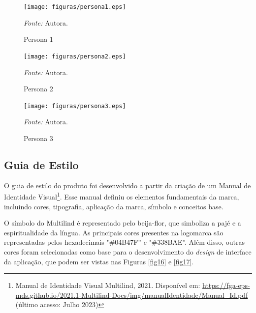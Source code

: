 \begin{figure}[h!]
	\centering
	\caption{Persona 1}
	\begin{adjustbox}{center}
		\texttt{[image: figuras/persona1.eps]}
	\end{adjustbox}
	\begin{tablenotes}[flushleft]
		\centering
		\item \textit{Fonte:} Autora.
	\end{tablenotes}
	\label{fig13}
\end{figure}

\begin{figure}[h!]
	\centering
	\caption{Persona 2}
	\begin{adjustbox}{center}
		\texttt{[image: figuras/persona2.eps]}
	\end{adjustbox}
	\begin{tablenotes}[flushleft]
		\centering
		\item \textit{Fonte:} Autora.
	\end{tablenotes}
	\label{fig14}
\end{figure}

\pagebreak

\begin{figure}[h!]
	\centering
	\caption{Persona 3}
	\begin{adjustbox}{center}
		\texttt{[image: figuras/persona3.eps]}
	\end{adjustbox}
	\begin{tablenotes}[flushleft]
		\centering
		\item \textit{Fonte:} Autora.
	\end{tablenotes}
	\label{fig15}
\end{figure}

\subsection{Guia de Estilo}
\label{Guia de Estilo}
O guia de estilo do produto foi desenvolvido a partir da criação de um Manual de Identidade Visual\footnote{Manual de Identidade Visual Multilind, 2021. Disponível
em: \url{https://fga-eps-mds.github.io/2021.1-Multilind-Docs/img/manualIdentidade/Manual_Id.pdf} (último acesso: Julho 2023)}. Esse manual definiu os elementos fundamentais da marca, incluindo cores, tipografia, aplicação da marca, símbolo e conceitos base.

O símbolo do Multilind é representado pelo beija-flor, que simboliza a pajé e a espiritualidade da língua. As principais cores presentes na logomarca são representadas pelos hexadecimais "\#04B47F'' e "\#338BAE''. Além disso, outras cores foram selecionadas 
como base para o desenvolvimento do \textit{design} de interface da aplicação, que podem ser vistas nas Figuras \ref{fig16} e \ref{fig17}.

